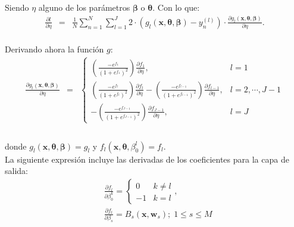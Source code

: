 		Siendo $\eta$ alguno de los parámetros $\boldsymbol{\beta}$ o $\boldsymbol{\theta}$. Con lo que:\\
		
		\begin{eqnarray*}
			\frac{\partial l}{\partial \eta} & = &  \frac{1}{N} \sum_{n=1}^{N} \sum_{l=1}^{J} 2\cdot\left( g_{l}(\mathbf{x},\boldsymbol{\theta},{\boldsymbol \beta})-y_n^{(l)}\right)\cdot\frac{\partial g_l(\mathbf{x},{\boldsymbol \theta},{\boldsymbol \beta})}{\partial \eta}. \nonumber
			\label{derivada}
		\end{eqnarray*}\\
		
		Derivando ahora la función $g$:\\
		
		\begin{eqnarray*}
			\frac{\partial g_l(\mathbf{x},{\boldsymbol \theta},{\boldsymbol \beta})}{\partial \eta} & = &
			\begin{cases}
				\displaystyle \left( \frac{-e^{f_{1}}}{\left( 1+ e^{f_{1}} \right)^2}\right) \frac{\partial f_{1}}{\partial \eta},& l=1 \\
				\displaystyle \left( \frac{-e^{f_{l}}}{\left( 1+ e^{f_{l}} \right)^2}\right) \frac{\partial f_{l}}{\partial \eta} -\left( \frac{-e^{f_{l-1}}}{\left( 1+ e^{f_{l-1}} \right)^2}\right) \frac{\partial f_{l-1}}{\partial \eta}, & l=2,\cdots,J-1\\
				\displaystyle -\left( \frac{-e^{f_{J-1}}}{\left( 1+ e^{f_{J-1}} \right)^2}\right) \frac{\partial f_{J-1}}{\partial \eta}, & l=J
			\end{cases}
			\nonumber \\
			\label{derivada_g}
		\end{eqnarray*}\\
		
		donde $g_l(\mathbf{x},{\boldsymbol \theta},{\boldsymbol \beta})=g_l$ y $f_l(\mathbf{x},{\boldsymbol \theta},\beta^l_0)=f_l$.\\

		La siguiente expresión incluye las derivadas de los coeficientes para la capa de salida:\\
		
		\begin{eqnarray}
			& \displaystyle \frac{\partial f_{l}}{\partial \beta_{0}^{k}} = \left\{ \begin{array}{ll}
         0 & \mbox{$k \neq l$}\\
        -1 & \mbox{$k = l$} \end{array} \right. , \nonumber \\
& \displaystyle \frac{\partial f_{l}}{\partial \beta_{s}} = B_{s}(\mathbf{x},\mathbf{w}_s);\;1\le s\le M \nonumber
		\end{eqnarray}\\

